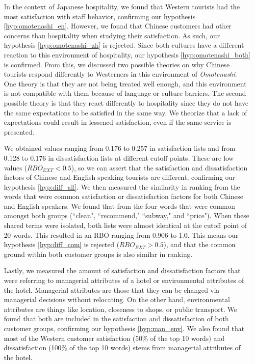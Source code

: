 \documentclass[smallextended,natbib]{svjour3}       %
\begin{document}
    In the context of Japanese hospitality, we found that Western tourists had the most satisfaction with staff behavior, confirming our hypothesis \ref{hyp:omotenashi_en}. However, we found that Chinese customers had other concerns than hospitality when studying their satisfaction. As such, our hypothesis \ref{hyp:omotenashi_zh} is rejected. Since both cultures have a different reaction to this environment of hospitality, our hypothesis \ref{hyp:omotenashi_both} is confirmed. From this, we discussed two possible theories on why Chinese tourists respond differently to Westerners in this environment of \textit{Omotenashi}. One theory is that they are not being treated well enough, and this environment is not compatible with them because of language or culture barriers. The second possible theory is that they react differently to hospitality since they do not have the same expectations to be satisfied in the same way. We theorize that a lack of expectations could result in lessened satisfaction, even if the same service is presented.

    We obtained values ranging from 0.176 to 0.257 in satisfaction lists and from 0.128 to 0.176 in dissatisfaction lists at different cutoff points. These are low values (\(RBO_{EXT} < 0.5\)), so we can assert that the satisfaction and dissatisfaction factors of Chinese and English-speaking tourists are different, confirming our hypothesis \ref{hyp:diff_all}. We then measured the similarity in ranking from the words that were common satisfaction or dissatisfaction factors for both Chinese and English speakers. We found that from the four words that were common amongst both groups (``clean", ``recommend," ``subway," and ``price"). When these shared terms were isolated, both lists were almost identical at the cutoff point of 20 words. This resulted in an RBO ranging from 0.906 to 1.0. This means our hypothesis \ref{hyp:diff_com} is rejected (\(RBO_{EXT} > 0.5\)), and that the common ground within both customer groups is also similar in ranking. 

    Lastly, we measured the amount of satisfaction and dissatisfaction factors that were referring to managerial attributes of a hotel or environmental attributes of the hotel. Managerial attributes are those that they can be changed via managerial decisions without relocating. On the other hand, environmental attributes are things like location, closeness to shops, or public transport. We found that both are included in the satisfaction and dissatisfaction of both customer groups, confirming our hypothesis \ref{hyp:man_env}. We also found that most of the Western customer satisfaction (50\% of the top 10 words) and dissatisfaction (100\% of the top 10 words) stems from managerial attributes of the hotel.
\end{document}
